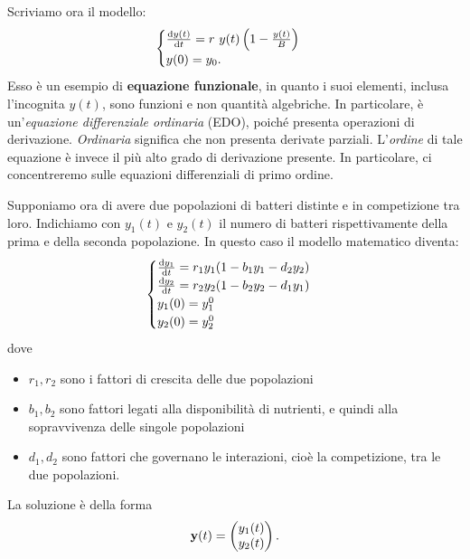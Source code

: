 Scriviamo ora il modello:
\begin{equation*}
\begin{cases}
\frac{\mathrm d y(t)}{\mathrm d t} =r\ y(t)\left( 1-\frac{y(t)}{B}\right)\\
y(0) =y_{0}.
\end{cases}
\end{equation*}
Esso è un esempio di \textbf{equazione funzionale}, in quanto i suoi elementi, inclusa l'incognita $y(t)$, sono funzioni e non quantità algebriche.
In particolare, è un'\textit{equazione differenziale ordinaria} (EDO), poiché presenta operazioni di derivazione.
\textit{Ordinaria} significa che non presenta derivate parziali.
L'\textit{ordine} di tale equazione è invece il più alto grado di derivazione presente.
In particolare, ci concentreremo sulle equazioni differenziali di primo ordine.

Supponiamo ora di avere due popolazioni di batteri distinte e in competizione tra loro. Indichiamo con $y_{1}(t)$ e $y_{2}(t)$ il numero di batteri rispettivamente della prima e della seconda popolazione. In questo caso il modello matematico diventa:
\begin{equation*}
\begin{cases}
\frac{\mathrm d y_{1}}{\mathrm d t} =r_{1} y_{1}( 1-b_{1} y_{1} -d_{2} y_{2})\\
\frac{\mathrm d y_{2}}{\mathrm d t} =r_{2} y_{2}( 1-b_{2} y_{2} -d_{1} y_{1})\\
y_{1}(0) =y^{0}_{1}\\
y_{2}(0) =y^{0}_{2}
\end{cases}
\end{equation*}
dove
\begin{itemize}
\item $r_{1} ,r_{2}$ sono i fattori di crescita delle due popolazioni
\item $b_{1} ,b_{2}$ sono fattori legati alla disponibilità di nutrienti, e quindi alla sopravvivenza delle singole popolazioni
\item $d_{1} ,d_{2}$ sono fattori che governano le interazioni, cioè la competizione, tra le due popolazioni.
\end{itemize}

La soluzione è della forma
\begin{equation*}
\mathbf{y}(t) =\begin{pmatrix}
y_{1}(t)\\
y_{2}(t)
\end{pmatrix}.
\end{equation*}

